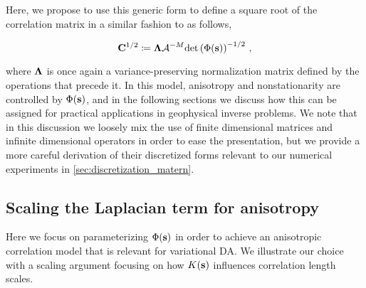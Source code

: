 Here, we propose to use this generic form to define a square root of the
correlation matrix in a similar fashion to
\citet{weaver_correlation_2001, mirouze_representation_2010,
carrier_background-error_2010}
as follows,
\begin{linenomath*}\begin{equation}
    \mathbf{C}^{1/2} \coloneqq \mathbf{\Lambda}
    \mathcal{A}^{-M}
    \text{det}\left(\Phi(\mathbf{s})\right)^{-1/2} \, ,
    \label{eq:matern_operator}
\end{equation}\end{linenomath*}
where $\mathbf{\Lambda}$ is
once again a variance-preserving normalization matrix defined by the operations
that precede it.
In this model,
anisotropy and nonstationarity are controlled by
$\Phi(\mathbf{s})$, and in the following sections
we discuss how this can be assigned for
practical applications in geophysical inverse problems.
We note that in this discussion we loosely mix the use of
finite dimensional matrices and infinite dimensional operators
in order to ease the presentation, but we provide a more careful
derivation of their discretized forms relevant to our numerical experiments in
\cref{sec:discretization_matern}.

\subsection{Scaling the Laplacian term for anisotropy}
\label{ssec:scaling_laplacian}

Here we focus on parameterizing $\Phi(\mathbf{s})$ in order to achieve an anisotropic
correlation model that is relevant for variational DA.
We illustrate our choice with a scaling argument focusing on how $K(\mathbf{s})$
influences correlation length scales.

